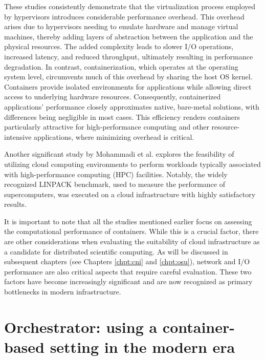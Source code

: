 These studies consistently demonstrate that the virtualization process employed
by hypervisors introduces considerable performance overhead.
This overhead arises due to hypervisors needing to emulate hardware and manage
virtual machines, thereby adding layers of abstraction between the application
and the physical resources.
The added complexity leads to slower I/O operations, increased latency, and
reduced throughput, ultimately resulting in performance degradation.
In contrast, containerization, which operates at the operating system level,
circumvents much of this overhead by sharing the host OS kernel.
Containers provide isolated environments for applications while allowing direct
access to underlying hardware resources. Consequently, containerized
applications' performance closely approximates native, bare-metal solutions,
with differences being negligible in most cases.
This efficiency renders containers particularly attractive for high-performance
computing and other resource-intensive applications, where minimizing overhead
is critical.

Another significant study by Mohammadi et al. \cite{Mohammadi2018} explores the
feasibility of utilizing cloud computing environments to perform workloads
typically associated with high-performance computing (HPC) facilities.
Notably, the widely recognized LINPACK benchmark, used to measure the
performance of supercomputers, was executed on a cloud infrastructure with
highly satisfactory results.

It is important to note that all the studies mentioned earlier focus on
assessing the computational performance of containers. While this is a crucial
factor, there are other considerations when evaluating the suitability of cloud
infrastructure as a candidate for distributed scientific computing.
As will be discussed in subsequent chapters (see Chapters \ref{chpt:cni} and
\ref{chpt:osu}), network and I/O performance are also critical aspects that
require careful evaluation. These two factors have become increasingly
significant and are now recognized as primary bottlenecks in modern
infrastructure.

\section{Orchestrator: using a container-based setting in the modern era}\label{sec:chpt1-orchestrator}




